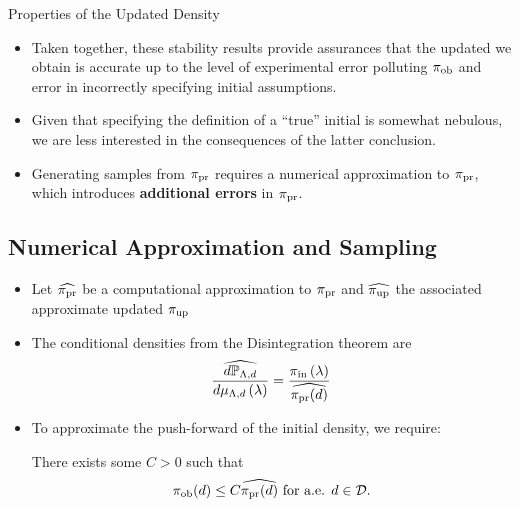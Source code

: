 \begin{frame}[t]{Properties of the Updated Density}
\begin{itemize}

	\item Taken together, these stability results provide assurances that the updated we obtain is accurate up to the level of experimental error polluting $\operatorname*{\pi_{ob}}$ and error in incorrectly specifying initial assumptions.
	\item Given that specifying the definition of a ``true'' initial is somewhat nebulous, we are less interested in the consequences of the latter conclusion.
	\item Generating samples from $\operatorname*{\pi_{pr}}$ requires a numerical approximation to $\operatorname*{\pi_{pr}}$, which introduces \textbf{additional errors} in $\operatorname*{\pi_{pr}}$.

\end{itemize}

\end{frame}


\subsection{Numerical Approximation and Sampling}
\begin{frame}[t]
\begin{itemize}
	\item Let $\widehat{\operatorname*{\pi_{pr}}}$ be a computational approximation to $\operatorname*{\pi_{pr}}$ and $\widehat{\operatorname*{\pi_{up}}}$ the associated approximate updated $\operatorname*{\pi_{up}}$
	\item The conditional densities from the Disintegration theorem are 
\[
\frac{\widehat{d\mathbb{P}_{{\Lambda}, d}}}{d\mu_{{\Lambda}, d}\left ( \lambda \right )} = \frac{\operatorname*{\pi_{in}}\left ( \lambda \right )}{ \widehat{\operatorname*{\pi_{pr}} (d)} }
\]
\vspace{0.25in}
	\item To approximate the push-forward of the initial density, we require:
\begin{assumption}\label{as:predx}
There exists some $C>0$ such that
\[
\operatorname*{\pi_{ob}} (d) \leq C \widehat{\operatorname*{\pi_{pr}}(d)} \text{ for a.e. } d\in \mathcal{D}.
\]
\end{assumption}

\end{itemize}

\end{frame}


